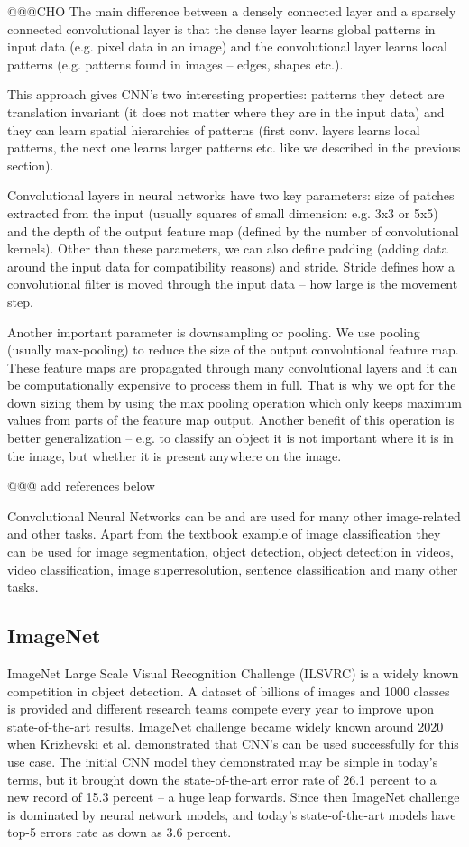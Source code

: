 \documentclass[b5paper]{book}
\begin{document}
@@@CHO
The main difference between a densely connected layer and a sparsely connected convolutional layer is that the dense layer learns global patterns in input data (e.g. pixel data in an image) and the convolutional layer learns local patterns (e.g. patterns found in images -- edges, shapes etc.).

This approach gives CNN's two interesting properties: patterns they detect are translation invariant (it does not matter where they are in the input data) and they can learn spatial hierarchies of patterns (first conv. layers learns local patterns, the next one learns larger patterns etc. like we described in the previous section).

Convolutional layers in neural networks have two key parameters: size of patches extracted from the input (usually squares of small dimension: e.g. 3x3 or 5x5) and the depth of the output feature map (defined by the number of convolutional kernels). Other than these parameters, we can also define padding (adding data around the input data for compatibility reasons) and stride. Stride defines how a convolutional filter is moved through the input data -- how large is the movement step. 

Another important parameter is downsampling or pooling. We use pooling (usually max-pooling) to reduce the size of the output convolutional feature map. These feature maps are propagated through many convolutional layers and it can be computationally expensive to process them in full. That is why we opt for the down sizing them by using the max pooling operation which only keeps maximum values from parts of the feature map output. Another benefit of this operation is better generalization -- e.g. to classify an object it is not important where it is in the image, but whether it is present anywhere on the image.

@@@ add references below

Convolutional Neural Networks can be and are used for many other image-related and other tasks. Apart from the textbook example of image classification they can be used for image segmentation, object detection, object detection in videos, video classification, image superresolution, sentence classification and many other tasks.

\subsection{ImageNet}

ImageNet Large Scale Visual Recognition Challenge (ILSVRC) is a widely known competition in object detection. A dataset of billions of images and 1000 classes is provided and different research teams compete every year to improve upon state-of-the-art results. ImageNet challenge became widely known around 2020 when Krizhevski et al. demonstrated that CNN's can be used successfully for this use case. The initial CNN model they demonstrated may be simple in today's terms, but it brought down the state-of-the-art error rate of 26.1 percent to a new record of 15.3 percent -- a huge leap forwards. Since then ImageNet challenge is dominated by neural network models, and today's state-of-the-art models have top-5 errors rate as down as 3.6 percent.
\end{document}
